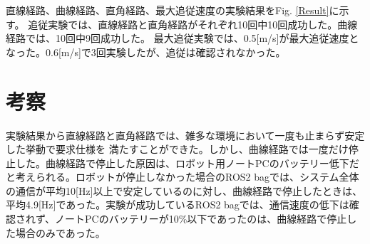 直線経路、曲線経路、直角経路、最大追従速度の実験結果をFig. \ref{Result}に示す。
追従実験では、直線経路と直角経路がそれぞれ10回中10回成功した。曲線経路では、10回中9回成功した。
最大追従実験では、0.5[m/s]が最大追従速度となった。0.6[m/s]で3回実験したが、追従は確認されなかった。

\section{考察}
実験結果から直線経路と直角経路では、雑多な環境において一度も止まらず安定した挙動で要求仕様を
満たすことができた。しかし、曲線経路では一度だけ停止した。曲線経路で停止した原因は、ロボット用ノートPCのバッテリー低下だと考えられる。ロボットが停止しなかった場合のROS2 bagでは、システム全体の通信が平均10[Hz]以上で安定しているのに対し、曲線経路で停止したときは、平均4.9[Hz]であった。実験が成功しているROS2 bagでは、通信速度の低下は確認されず、ノートPCのバッテリーが10\%以下であったのは、曲線経路で停止した場合のみであった。